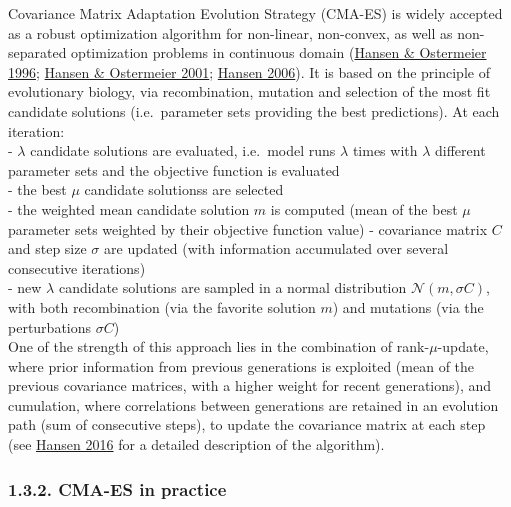 \documentclass[11pt,]{article}
\begin{document}
Covariance Matrix Adaptation Evolution Strategy (CMA-ES) is widely
accepted as a robust optimization algorithm for non-linear, non-convex,
as well as non-separated optimization problems in continuous domain
(\protect\hyperlink{ref-Hansen1996}{Hansen \& Ostermeier 1996};
\protect\hyperlink{ref-Hansen2001}{Hansen \& Ostermeier 2001};
\protect\hyperlink{ref-Hansen2006}{Hansen 2006}). It is based on the
principle of evolutionary biology, via recombination, mutation and
selection of the most fit candidate solutions (i.e.~parameter sets
providing the best predictions). At each iteration:\\
- \(\lambda\) candidate solutions are evaluated, i.e.~model runs
\(\lambda\) times with \(\lambda\) different parameter sets and the
objective function is evaluated\\
- the best \(\mu\) candidate solutionss are selected\\
- the weighted mean candidate solution \(m\) is computed (mean of the
best \(\mu\) parameter sets weighted by their objective function value)
- covariance matrix \(C\) and step size \(\sigma\) are updated (with
information accumulated over several consecutive iterations)\\
- new \(\lambda\) candidate solutions are sampled in a normal
distribution \(\mathcal{N}(m, \sigma C)\), with both recombination (via
the favorite solution \(m\)) and mutations (via the perturbations
\(\sigma C\))\\
One of the strength of this approach lies in the combination of
rank-\(\mu\)-update, where prior information from previous generations
is exploited (mean of the previous covariance matrices, with a higher
weight for recent generations), and cumulation, where correlations
between generations are retained in an evolution path (sum of
consecutive steps), to update the covariance matrix at each step (see
\protect\hyperlink{ref-Hansen2016}{Hansen 2016} for a detailed
description of the algorithm).

\hypertarget{cma-es-in-practice}{%
\subsubsection{1.3.2. CMA-ES in practice}\label{cma-es-in-practice}}
\end{document}
